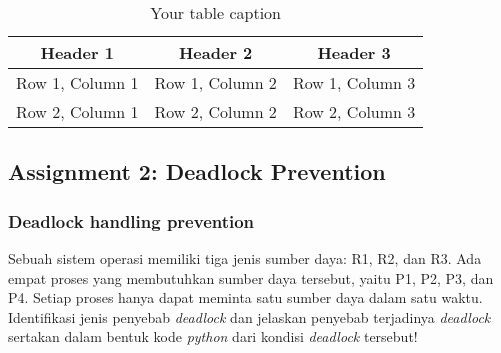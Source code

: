 \documentclass[12pt]{article}
\begin{document}
\begin{table}[htbp] %
    \centering
    \begin{tabular}{|c|c|c|} %
    \hline
    Header 1 & Header 2 & Header 3 \\ %
    \hline
    Row 1, Column 1 & Row 1, Column 2 & Row 1, Column 3 \\ %
    \hline
    Row 2, Column 1 & Row 2, Column 2 & Row 2, Column 3 \\ %
    \hline
    \end{tabular}
    \caption{Your table caption} %
    \label{tab:your_label} %
\end{table}
\subsection{Assignment 2: Deadlock Prevention}
    \subsubsection{Deadlock handling prevention} Sebuah sistem operasi memiliki tiga jenis sumber daya: R1, R2, dan R3. Ada empat proses yang membutuhkan sumber daya tersebut, yaitu P1, P2, P3, dan P4. Setiap proses hanya dapat meminta satu sumber daya dalam satu waktu. Identifikasi jenis penyebab \textit{deadlock} dan jelaskan penyebab terjadinya \textit{deadlock} sertakan dalam bentuk kode \textit{python} dari kondisi \textit{deadlock} tersebut!
\end{document}
